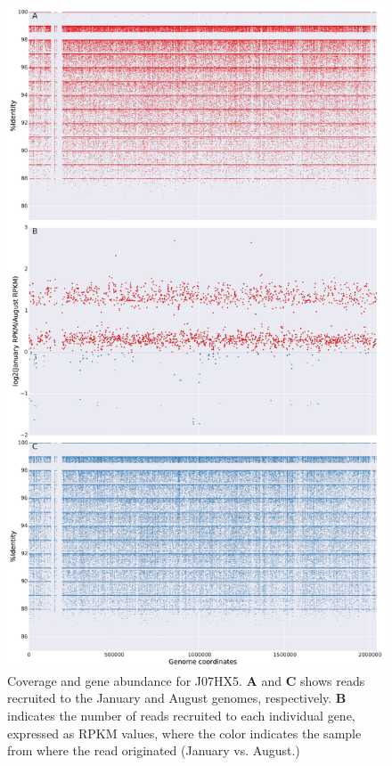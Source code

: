 \begin{figure}[!hbtp]
  \centering
  \includegraphics[width=\textwidth,height=0.8\textheight,keepaspectratio]{Chapter5/Figures/coverage_plots/J07HX5_coverage.pdf}
  \caption{Coverage and gene abundance for J07HX5. \textbf{A} and \textbf{C} shows reads recruited to the January and August genomes, respectively. \textbf{B} indicates the number of reads recruited to each individual gene, expressed as RPKM values, where the color indicates the sample from where the read originated (January vs. August.)}
  \label{J07HX5coverage}
\end{figure}


